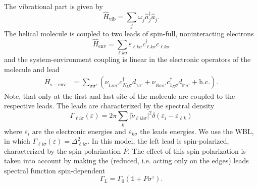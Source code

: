 \documentclass{article}
\newcommand{\pdagger}{{\phantom{\dagger}}}
\begin{document}
The vibrational part is given by
\begin{equation}
	\hat{H}_\mathrm{vib} = \sum_{j} \omega_{j}^\pdagger \hat{a}_{j}^\dagger \hat{a}_{j}^\pdagger.
	\label{eq:H_vib} 
\end{equation}
The helical molecule is coupled to two leads of spin-full, noninteracting electrons
\begin{equation}
	\hat{H}_\mathrm{env} = \sum_{\ell k\sigma} \varepsilon_{\ell k\sigma}^\pdagger c_{\ell k\sigma}^\dagger c_{\ell k\sigma}^\pdagger \label{eq:LeadHamiltonian}
\end{equation}
and the system-environment coupling is linear in the electronic operators of the molecule and lead
\begin{align}
	H_\mathrm{s-env} &= \sum_{\sigma\sigma'}(\nu_{L\sigma\sigma'}^\pdagger c_{N_L\sigma}^\dagger d_{1\sigma'}^\pdagger + \nu_{R\sigma\sigma'}^\pdagger c_{1_R\sigma}^\dagger d_{\mathbb{M}\sigma'}^\pdagger + \mathrm{h.c.}). \label{eq:LeadSysHamiltonian}
\end{align} 
Note, that only at the first and last site of the molecule are coupled to the respective leads. 
The leads are characterized by the spectral density
\begin{equation}
	\Gamma_{\ell i\sigma}(\varepsilon) = 2\pi \sum_{k} \vert \tilde{\nu}_{\ell ik\sigma}\vert^2 \delta(\varepsilon_{i}-\varepsilon_{\ell k})
\end{equation}
where $\varepsilon_{i}$ are the electronic energies and $\varepsilon_{k\sigma}$ the leads energies. We use the WBL, in which $\Gamma_{\ell i\sigma}(\varepsilon)=\Delta_{\ell i\sigma}^2$. 
In this model, the left lead is spin-polarized, characterized by the spin polarization $P$. The effect of this spin polarization is taken into account by making the (reduced, i.e. acting only on the edges) leads spectral function spin-dependent
\begin{equation}
	\Gamma_L= \Gamma_0 (\mathds{1}+P\sigma^z).
\end{equation}
\end{document}
